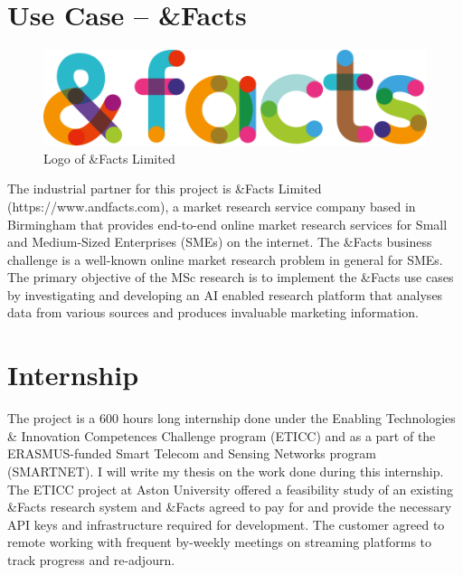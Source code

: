 \section{Use Case – \&Facts}
\begin{figure}[H]
	\centering
	\includegraphics[scale=0.3]{img/andfacts.png}
	\caption{Logo of \&Facts Limited}
\end{figure} 
The industrial partner for this project is \&Facts Limited (https://www.andfacts.com), a market research service company based in Birmingham that provides end-to-end online market research services for Small and Medium-Sized Enterprises (SMEs) on the internet. The \&Facts business challenge is a well-known online market research problem in general for SMEs. The primary objective of the MSc research is to implement the \&Facts use cases by investigating and developing an AI enabled research platform that analyses data from various sources and produces invaluable marketing information. 

\newpage
\section{Internship}
The project is a 600 hours long internship done under the Enabling Technologies \& Innovation Competences Challenge program (ETICC) and as a part of the ERASMUS-funded Smart Telecom and Sensing Networks program (SMARTNET). I will write my thesis on the work done during this internship. The ETICC project at Aston University offered a feasibility study of an existing \&Facts research system and \&Facts agreed to pay for and provide the necessary API keys and infrastructure required for development. The customer agreed to remote working with frequent by-weekly meetings on streaming platforms to track progress and re-adjourn.

